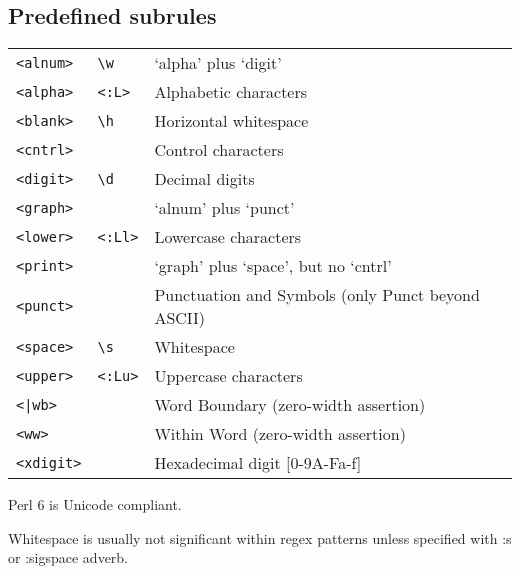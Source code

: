 \documentclass{article}
\begin{document}
\subsection{Predefined subrules}
\begin{tabular}{lll}
	\verb|<alnum>|   & \verb|\w|      & `alpha' plus `digit'\\
	\verb|<alpha>|   & \verb|<:L>|     & Alphabetic characters\\
	\verb|<blank>|   & \verb|\h|      &  Horizontal whitespace\\
	\verb|<cntrl>|  &        &   Control characters\\
	\verb|<digit>|  &  \verb|\d|   &    Decimal digits\\
	\verb|<graph>|  &       &   `alnum' plus `punct'\\
	\verb|<lower>|  & \verb|<:Ll>|  &  Lowercase characters\\
	\verb|<print>|  &       &   `graph' plus `space', but no `cntrl'\\
	\verb|<punct>|  &      &    Punctuation and Symbols (only Punct beyond ASCII)\\
	\verb|<space>| &  \verb|\s|    &   Whitespace\\
	\verb|<upper>| &  \verb|<:Lu>|  &  Uppercase characters\\
	\texttt{<|wb>}   &       &     Word Boundary (zero-width assertion)\\
	\verb|<ww>|   &       &    Within Word (zero-width assertion)\\
	\verb|<xdigit>| &     &    Hexadecimal digit [0-9A-Fa-f]\\
	
	
	
	
	
\end{tabular}

	
	Perl 6 is Unicode compliant.
	
	Whitespace is usually not significant within regex patterns unless specified with :s or :sigspace adverb.
	
	
	
	
	
	
\end{document}
